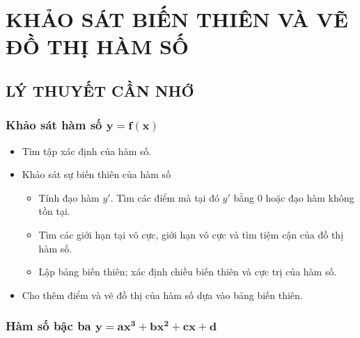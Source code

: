 \setcounter{section}{3}
\section{KHẢO SÁT BIẾN THIÊN VÀ VẼ ĐỒ THỊ HÀM SỐ}
\subsection{LÝ THUYẾT CẦN NHỚ}
\subsubsection{Khảo sát hàm số $\bm{y= f(x)}$}
\begin{itemize}
	\item[\iconCH]  Tìm tập xác định của hàm số.
	\item [\iconCH]  Khảo sát sự biến thiên của hàm số
	      \begin{itemize}
		      \item Tính đạo hàm $y'$. Tìm các điểm mà tại đó $y'$ bằng $0$ hoặc đạo hàm không tồn tại.
		      \item Tìm các giới hạn tại vô cực, giới hạn vô cực và tìm tiệm cận của đồ thị hàm số.
		      \item Lập bảng biến thiên; xác định chiều biến thiên và cực trị của hàm số.
	      \end{itemize}
	\item [\iconCH]  Cho thêm điểm và vẽ đồ thị của hàm số dựa vào bảng biến thiên.
\end{itemize}

\subsubsection{Hàm số bậc ba $\bm{y=ax^3+bx^2+cx+d}$}

